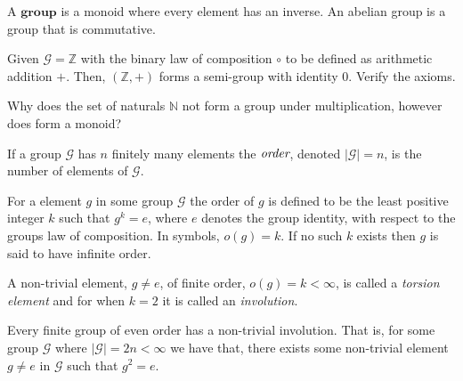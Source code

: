 \begin{defn}[Group]
 A $\textbf{group}$ is a monoid where every element has an inverse. An abelian group is a group that is commutative.
\end{defn}

\begin{exmp}
 Given $\mathcal{G} = \mathbb{Z}$ with the binary law of composition $\circ$ to be defined as arithmetic addition $+$.
 Then, $(\mathbb{Z}, +)$ forms a semi-group with identity $0$. Verify the axioms.
\end{exmp}

\begin{question}
 Why does the set of naturals $\mathbb{N}$ not form a group under multiplication, however does form a monoid?
\end{question}

\begin{defn}
	If a group $\mathcal{G}$ has $n$ finitely many elements the $\emph{order}$, denoted
	$\left| \mathcal{G} \right| = n$, is the number of elements of $\mathcal{G}$.
\end{defn}

\begin{defn}
	For a element $g$ in some group $\mathcal{G}$ the order of $g$ is defined to be
	the least positive integer $k$ such that $g^k = e$, where $e$ denotes the group identity,
	with respect to the groups law of composition. In symbols, $o(g)=k$. If no such $k$ exists
	then $g$ is said to have infinite order.
\end{defn}

\begin{rem}
	A non-trivial element, $g \neq e$, of finite order, $o(g)=k < \infty$, is called a
	\emph{torsion element} and for when $k=2$ it is called an \emph{involution}.
\end{rem}

\begin{thm}
	Every finite group of even order has a non-trivial involution. That is, for some group
	$\mathcal{G}$ where $|\mathcal{G}| = 2n < \infty$ we have that, there exists some
	non-trivial element $g \neq e$ in $\mathcal{G}$ such that $g^2 = e$.
\end{thm}

